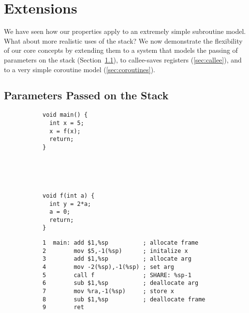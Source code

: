 \documentclass[acmsmall,review,anonymous]{acmart}\settopmatter{printfolios=true,printccs=false,printacmref=false}
\begin{document}
{{\section{Extensions}
\label{sec:ext}

We have seen how our properties apply to an extremely simple
subroutine model.
What about more realistic uses of the stack? We now demonstrate the
flexibility of our core concepts by extending
them to a system that models the passing of
parameters on the stack (Section~\ref{sec:passing}), to callee-saves
registers  (\ref{sec:callee}), and to a very simple coroutine model
(\ref{sec:coroutines}).

\subsection{Parameters Passed on the Stack}
\label{sec:passing}

\newcommand{\mainpassc}{magenta}

\begin{figure}
  \centering
  \begin{subfigure}[t]{.2\textwidth}
{\small
\begin{verbatim}
void main() {
  int x = 5;
  x = f(x);
  return;
}





void f(int a) {
  int y = 2*a;
  a = 0;
  return;
}
\end{verbatim}
}
  \end{subfigure}
  \begin{subfigure}[t]{.6\textwidth}
{\small
\begin{verbatim}
1  main: add $1,%sp          ; allocate frame
2        mov $5,-1(%sp)      ; initalize x
3        add $1,%sp          ; allocate arg
4        mov -2(%sp),-1(%sp) ; set arg
5        call f              ; SHARE: %sp-1
6        sub $1,%sp          ; deallocate arg
7        mov %ra,-1(%sp)     ; store x
8        sub $1,%sp          ; deallocate frame
9        ret


\end{verbatim}}
\end{subfigure}
\end{figure}}}
\end{document}
